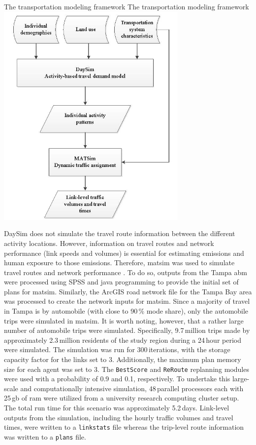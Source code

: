 \createfigure%
{The transportation modeling framework}%
{The transportation modeling framework}%
{\label{fig:tampa-fig2}}%
{\includegraphics[width=0.7\textwidth, angle=0]{./scenarios/figures/tampa-fig2.jpg}}%
{}

DaySim does not simulate the travel route information between the different activity locations. 
However, information on travel routes and network performance (\ie link speeds and volumes) is essential for estimating emissions and human exposure to those emissions. 
Therefore, \gls{matsim} was used to simulate travel routes and network performance \citep[][]{BalmerEtAl_TRBTDF_2008}. 
To do so, outputs from the Tampa \gls{abm} were processed using SPSS and \gls{java} programming to provide the initial set of plans for \gls{matsim}. 
Similarly, the ArcGIS road network file for the Tampa Bay area was processed to create the network inputs for \gls{matsim}. 
Since a majority of travel in Tampa is by automobile (with close to 90\,\% mode share), only the automobile trips were simulated in \gls{matsim}. 
It is worth noting, however, that a rather large number of automobile trips were simulated. 
Specifically, 9.7\,million trips made by approximately 2.3\,million residents of the study region during a 24\,hour period were simulated. 
The simulation was run for 300\,iterations, with the storage capacity factor for the links set to 3. 
Additionally, the maximum plan memory size for each agent was set to 3. The \lstinline|BestScore| and \lstinline|ReRoute| replanning modules were used with a probability of 0.9 and 0.1, respectively. 
To undertake this large-scale and computationally intensive simulation, 48\,parallel processors each with 25\,\gls{gb} of \gls{ram} were utilized from a university research computing cluster setup. 
The total run time for this scenario was approximately 5.2\,days. 
Link-level outputs from the simulation, including the hourly traffic volumes and travel times, were written to a \lstinline|linkstats| file whereas the trip-level route information was written to a \lstinline|plans| file.

